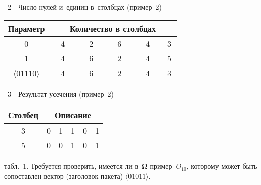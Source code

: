 \begin{multicols}{2}
\vspace*{3pt}

\noindent
{\small
 \begin{center}  %
 \parbox{58mm}{{\tablename~2}\ \ \small{Число нулей и~единиц в~столбцах (пример~2)}}

\vspace*{2ex}

    \begin{tabular}{|c|c|c|c|c|c|}
\hline
Параметр& \multicolumn{5}{c|}{Количество в столбцах}\\
\hline
0&\ \ 4\ \ &\ \ 2\ \ &\ \ 6\ \ &\ \ 4\ \ &\,3\,\\
1&\ \ 4\ \ &\ \ 6\ \ &\ \ \cellcolor[gray]{.6}2\ \ &\ \ 4\ \ &\,5\,\\
$\langle$01110$\rangle$&\ 4\ &\ 6\ &\ \cellcolor[gray]{.6}2\ &\ 4\ &3\\
\hline
\end{tabular}
\end{center}
}

\vspace*{3pt}

\noindent
{\small
 \begin{center}  %
 \parbox{46mm}{{\tablename~3}\ \ \small{Результат усечения (пример~2)}}

\vspace*{2ex}

      \begin{tabular}{|c|c|c|c|c|c|}
     \hline
     Столбец &\multicolumn{5}{c|}{Описание}\\
     \hline
3&0&1&\cellcolor[gray]{.6}1&0&1\\
      5&0&0&\cellcolor[gray]{.6}1&0&1\\
      \hline
      \end{tabular}
\end{center}
}




\vspace*{9pt}

        
     
     \smallskip
     
     \noindent
 табл.~1. 
Требуется проверить, имеется ли в~${\boldsymbol{\Omega}}$ пример~$O_{10}$, которому 
может быть сопоставлен вектор (заголовок пакета) $\langle01011\rangle$.
     

\end{multicols}
